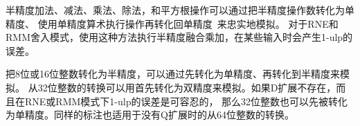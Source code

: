 \begin{commentary}
  半精度加法、减法、乘法、除法，和平方根操作可以通过把半精度操作数转化为单精度、
  使用单精度算术执行操作再转化回单精度~\cite{roux:hal-01091186}来忠实地模拟。
  对于RNE和RMM舍入模式，使用这种方法执行半精度融合乘加，在某些输入时会产生1-ulp的误差。

把8位或16位整数转化为半精度，可以通过先转化为单精度、再转化到半精度来模拟。
从32位整数的转换可以用首先转化为双精度来模拟。如果D扩展不存在，而且在RNE或RMM模式下1-ulp的误差是可容忍的，
那么32位整数也可以先被转化为单精度。同样的标注也适用于没有Q扩展时的从64位整数的转换。
\end{commentary}
